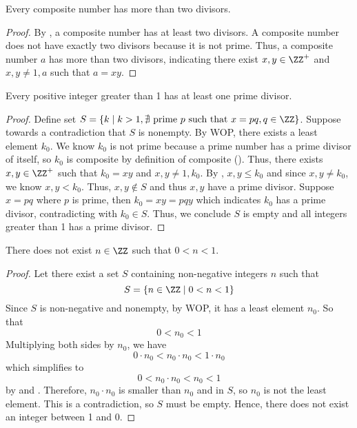 \begin{lemma}
    Every composite number has more than two divisors.
\end{lemma}

\begin{proof}
    By , a composite number has at least two divisors. A composite number does not have exactly two divisors because it is not prime. Thus, a composite number $a$ has more than two divisors, indicating there exist $x,y\in\ZZ^+$ and $x,y\neq 1,a$ such that $a=xy$.
\end{proof}

\begin{lemma}\label{every_has_prime_divisor}
    Every positive integer greater than 1 has at least one prime divisor. 
\end{lemma}
\begin{proof}
    Define set $S=\left\{k\mid k>1, \nexists \text{ prime } p \text{ such that } x=pq, q\in\ZZ  \right\}$. Suppose towards a contradiction that $S$ is nonempty. By WOP, there exists a least element $k_0$. We know $k_0$ is not prime because a prime number has a prime divisor of itself, so $k_0$ is composite by definition of composite (). Thus, there exists $x,y\in\ZZ^+$ such that $k_0=xy$ and $x,y\neq 1,k_0$. By , $x,y\leq k_0$ and since $x,y\neq k_0$, we know $x,y<k_0$. Thus, $x,y\notin S$ and thus $x,y$ have a prime divisor. Suppose $x=pq$ where $p$ is prime, then $k_0=xy=pqy$ which indicates $k_0$ has a prime divisor, contradicting with $k_0\in S$. Thus, we conclude $S$ is empty and all integers greater than 1 has a prime divisor.
\end{proof}

\begin{theorem} \label{nibzo}
    There does not exist $n \in \ZZ$ such that $0 < n < 1$.
\end{theorem}
\begin{proof}
    Let there exist a set $S$ containing non-negative integers $n$ such that 
     \[S=\{ n \in \ZZ \mid 0 < n < 1\}\]
    Since $S$ is non-negative and nonempty, by WOP, it has a least element $n_0$. So that
    \[0<n_0<1\]
    Multiplying both sides by $n_0$, we have
    \[0 \cdot n_0<n_0 \cdot n_0<1 \cdot n_0\]
    which simplifies to
    \[0 <n_0 \cdot n_0<n_0 <1\]
    by  and . Therefore, $n_0 \cdot n_0$ is smaller than $n_0$ and in $S$, so $n_0$ is not the least element. This is a contradiction, so $S$ must be empty. Hence, there does not exist an integer between 1 and 0.
\end{proof}

